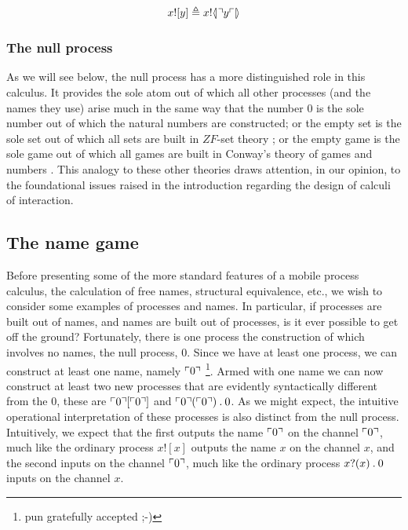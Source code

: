 \begin{eqnarray}
	x![y] \triangleq x!\langle\!| \urcorner y \ulcorner |\!\rangle \nonumber
\end{eqnarray}

\subsubsection{The null process}

As we will see below, the null process has a more distinguished role
in this calculus. It provides the sole atom out of which all other
processes (and the names they use) arise much in the same way that the
number $0$ is the sole number out of which the natural numbers are
constructed; or the empty set is the sole set out of which all sets
are built in $ZF$-set theory \cite{Krivine-TheCurryHowardCorre}; or
the empty game is the sole game out of which all games are built in
Conway's theory of games and numbers \cite{ONAG}. This analogy to
these other theories draws attention, in our opinion, to the
foundational issues raised in the introduction regarding the design of
calculi of interaction.

\subsection{The name game}

Before presenting some of the more standard features of a mobile
process calculus, the calculation of free names, structural
equivalence, etc., we wish to consider some examples of processes and
names. In particular, if processes are built out of names, and names
are built out of processes, is it ever possible to get off the ground?
Fortunately, there is one process the construction of which involves
no names, the null process, $0$. Since we have at least one process,
we can construct at least one name, namely $\ulcorner 0 \urcorner$ \footnote{pun
gratefully accepted ;-)}. Armed with one name we can now construct at
least two new processes that are evidently syntactically different
from the $0$, these are $\ulcorner 0 \urcorner[{\ulcorner 0 \urcorner}]$ and
$\ulcorner 0 \urcorner({\ulcorner 0 \urcorner}) \mathbin{.} 0$. As we might expect,
the intuitive operational interpretation of these processes is also
distinct from the null process. Intuitively, we expect that the first
outputs the name $\ulcorner 0 \urcorner$ on the channel $\ulcorner 0 \urcorner$, much like
the ordinary {\pic} process $x![x]$ outputs the name $x$ on
the channel $x$, and the second inputs on the channel $\ulcorner 0 \urcorner$,
much like the ordinary {\pic} process $x?(x) \mathbin{.} 0$
inputs on the channel $x$.

